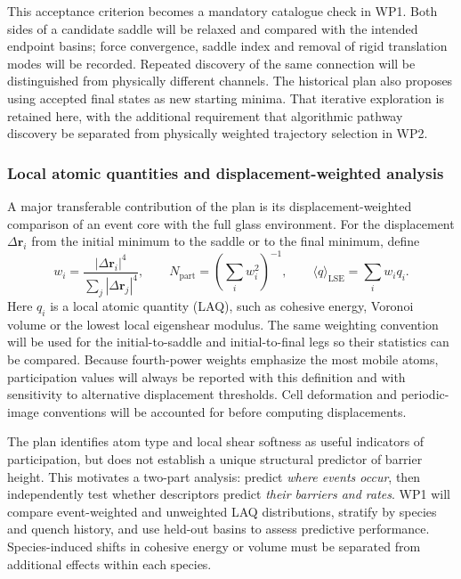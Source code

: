 \documentclass[11pt,a4paper]{article}
\begin{document}
This acceptance criterion becomes a mandatory catalogue check in WP1. Both sides of a candidate saddle will be relaxed and compared with the intended endpoint basins; force convergence, saddle index and removal of rigid translation modes will be recorded. Repeated discovery of the same connection will be distinguished from physically different channels. The historical plan also proposes using accepted final states as new starting minima. That iterative exploration is retained here, with the additional requirement that algorithmic pathway discovery be separated from physically weighted trajectory selection in WP2.

\subsubsection{Local atomic quantities and displacement-weighted analysis}
A major transferable contribution of the plan is its displacement-weighted comparison of an event core with the full glass environment. For the displacement $\Delta\mathbf r_i$ from the initial minimum to the saddle or to the final minimum, define
\begin{equation}
 w_i=\frac{|\Delta\mathbf r_i|^4}{\sum_j|\Delta\mathbf r_j|^4},\qquad
 N_{\mathrm{part}}=\left(\sum_i w_i^2\right)^{-1},\qquad
 \langle q\rangle_{\mathrm{LSE}}=\sum_iw_iq_i.
 \label{eq:planweights}
\end{equation}
Here $q_i$ is a local atomic quantity (LAQ), such as cohesive energy, Voronoi volume or the lowest local eigenshear modulus. The same weighting convention will be used for the initial-to-saddle and initial-to-final legs so their statistics can be compared. Because fourth-power weights emphasize the most mobile atoms, participation values will always be reported with this definition and with sensitivity to alternative displacement thresholds. Cell deformation and periodic-image conventions will be accounted for before computing displacements.

The plan identifies atom type and local shear softness as useful indicators of participation, but does not establish a unique structural predictor of barrier height. This motivates a two-part analysis: predict \emph{where events occur}, then independently test whether descriptors predict \emph{their barriers and rates}. WP1 will compare event-weighted and unweighted LAQ distributions, stratify by species and quench history, and use held-out basins to assess predictive performance. Species-induced shifts in cohesive energy or volume must be separated from additional effects within each species.
\end{document}
